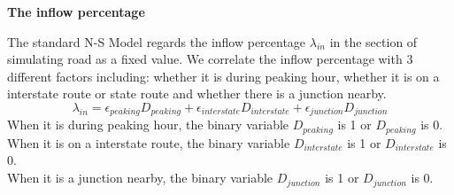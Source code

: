 \documentclass{mcmthesis}
\numberwithin{equation}{section}
\begin{document}
				\noindent \textbf{The inflow percentage}

					The standard N-S Model regards the inflow percentage $\lambda_{in}$ in the section of simulating road as a fixed value. We correlate the inflow percentage with 3 different factors including: whether it is during peaking hour, whether it is on a interstate route or state route and whether there is a junction nearby. 
					\begin{equation}
						\lambda_{in} =  \epsilon_{peaking}D_{peaking} + \epsilon_{interstate}D_{interstate} + \epsilon_{junction}D_{junction}
					\end{equation}
					\noindent When it is during peaking hour, the binary variable $D_{peaking}$ is 1 or $D_{peaking}$ is 0.\\
					When it is on a interstate route, the binary variable $D_{interstate}$ is 1 or $D_{interstate}$ is 0.\\
					When it is a junction nearby, the binary variable $D_{junction}$ is 1 or $D_{junction}$ is 0.
\end{document}
